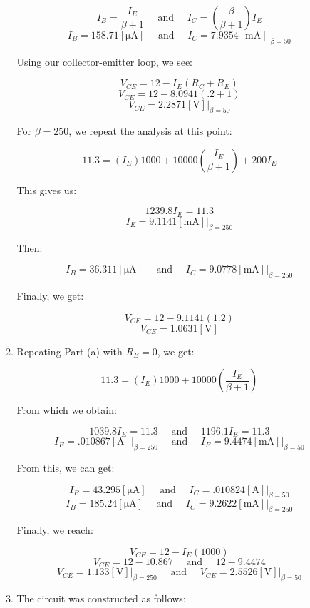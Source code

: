 \begin{enumerate}
\begin{enumerate}
        $$I_B=\frac{I_E}{\beta+1}\quad\text{ and }\quad I_C=\left( \frac{\beta}{\beta+1} \right)I_E$$
        $$\boxed{I_B=158.71[\si{\micro\ampere}]\quad\text{ and }\quad I_C=7.9354[\si{\milli\ampere}]\Big|_{\beta=50}}$$

        Using our collector-emitter loop, we see:

        $$V_{CE}=12-I_E(R_C+R_E)$$
        $$V_{CE}=12-8.0941(.2+1)$$
        $$\boxed{V_{CE}=2.2871[\si{\volt}]\Big|_{\beta=50}}$$

        For $\beta=250$, we repeat the analysis at this point:

        $$11.3=(I_E)1000+10000\left( \frac{I_E}{\beta+1} \right)+200I_E$$

        This gives us:

        $$1239.8I_E=11.3$$
        $$\boxed{I_E=9.1141[\si{\milli\ampere}]\Big|_{\beta=250}}$$

        Then:

        $$\boxed{I_B=36.311[\si{\micro\ampere}]\quad\text{ and }\quad I_C=9.0778[\si{\milli\ampere}]\Big|_{\beta=250}}$$

        Finally, we get:

        $$V_{CE}=12-9.1141(1.2)$$
        $$\boxed{V_{CE}=1.0631[\si{\volt}]}$$

      \item Repeating Part (a) with $R_E=0$, we get:

        $$11.3=(I_E)1000+10000\left( \frac{I_E}{\beta+1} \right)$$

        From which we obtain:

        $$1039.8I_E=11.3\quad\text{ and }\quad1196.1I_E=11.3$$
        $$\boxed{I_E=.010867[\si{\ampere}]\Big|_{\beta=250}\quad\text{ and }\quad I_E=9.4474[\si{\milli\ampere}]\Big|_{\beta=50}}$$

        From this, we can get:

        $$\boxed{I_B=43.295[\si{\micro\ampere}]\quad\text{ and }\quad I_C=.010824[\si{\ampere}]\Big|_{\beta=50}}$$
        $$\boxed{I_B=185.24[\si{\micro\ampere}]\quad\text{ and }\quad I_C=9.2622[\si{\milli\ampere}]\Big|_{\beta=250}}$$

        Finally, we reach:

        $$V_{CE}=12-I_E(1000)$$
        $$V_{CE}=12-10.867\quad\text{ and }\quad 12-9.4474$$
        $$\boxed{V_{CE}=1.133[\si{\volt}]\Big|_{\beta=250}\quad\text{ and }\quad V_{CE}=2.5526[\si{\volt}]\Big|_{\beta=50}}$$

      \item The circuit was constructed as follows:


\end{enumerate}
\end{enumerate}
